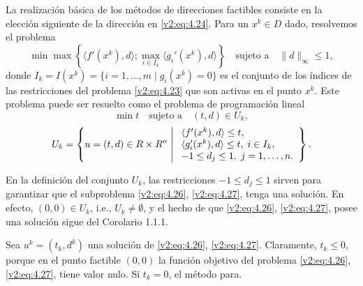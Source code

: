 La realización básica de los métodos de direcciones factibles consiste en la elección siguiente de la dirección en \eqref{v2:eq:4.24}. Para un $x^k \in D$ dado, resolvemos el problema
\[
    \min \max \left\{ \langle f'(x^k), d \rangle; \max_{i \in I_k} \langle g_i'(x^k), d \rangle \right\} \quad \text{sujeto a} \quad \|d\|_\infty \le 1,
\]
donde $I_k = I(x^k) = \{i = 1, \dots, m \mid g_i(x^k) = 0\}$ es el conjunto de los índices de las restricciones del problema \eqref{v2:eq:4.23} que son activas en el punto $x^k$. Este problema puede ser resuelto como el problema de programación lineal
\begin{equation}
    \min t \quad \text{sujeto a} \quad (t, d) \in U_k,
    \label{v2:eq:4.26}
\end{equation}
\begin{equation}
    U_k = \left\{ u = (t, d) \in R \times R^n \;\middle|\;
    \begin{array}{l}
        \langle f'(x^k), d \rangle \le t, \\
        \langle g_i'(x^k), d \rangle \le t, \; i \in I_k, \\
        -1 \le d_j \le 1, \; j = 1, \dots, n.
    \end{array}
    \right\}.
    \label{v2:eq:4.27}
\end{equation}

En la definición del conjunto $U_k$, las restricciones $-1 \le d_j \le 1$ sirven para garantizar que el subproblema \eqref{v2:eq:4.26}, \eqref{v2:eq:4.27}, tenga una solución. En efecto, $(0, 0) \in U_k$, i.e., $U_k \neq \emptyset$, y el hecho de que \eqref{v2:eq:4.26}, \eqref{v2:eq:4.27}, posee una solución sigue del Corolario 1.1.1.

Sea $u^k = (t_k, d^k)$ una solución de \eqref{v2:eq:4.26}, \eqref{v2:eq:4.27}. Claramente, $t_k \le 0$, porque en el punto factible $(0, 0)$ la función objetivo del problema \eqref{v2:eq:4.26}, \eqref{v2:eq:4.27}, tiene valor nulo. Si $t_k = 0$, el método para.

